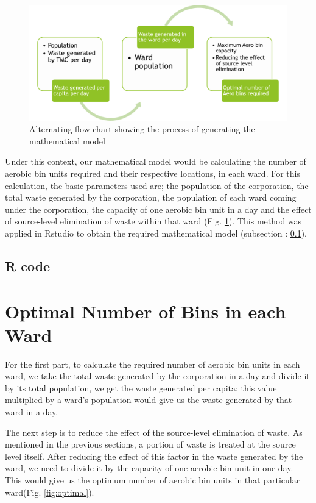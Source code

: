 \documentclass[12pt,a4paper]{report}
\begin{document}
\begin{figure}[H]
	\centering
	\includegraphics[width=0.8\linewidth]{mathmod}
	\caption{Alternating flow chart showing the process of generating the mathematical model}
	\label{fig:mathmod}
\end{figure}

Under this context, our mathematical model would be calculating the number of aerobic bin units required and their respective locations, in each ward. For this calculation, the basic parameters used are; the population of the corporation, the total waste generated by the corporation, the population of each ward coming under the corporation, the capacity of one aerobic bin unit in a day and the effect of source-level elimination of waste within that ward (Fig. \ref{fig:mathmod}). This method was applied in Rstudio to obtain the required mathematical model (subsection : \ref{Rcode}). 


\newpage
\subsection{R code}
\label{Rcode}
\lstset{style=mystyle}


\newpage
\section{Optimal Number of Bins in each Ward}
For the first part, to calculate the required number of aerobic bin units in each ward, we take the total waste generated by the corporation in a day and divide it by its total population, we get the waste generated per capita; this value multiplied by a ward’s population would give us the waste generated by that ward in a day. 

The next step is to reduce the effect of the source-level elimination of waste. As mentioned in the previous sections, a portion of waste is treated at the source level itself. After reducing the effect of this factor in the waste generated by the ward, we need to divide it by the capacity of one aerobic bin unit in one day. This would give us the optimum number of aerobic bin units in that particular ward(Fig. \ref{fig:optimal}). 
\end{document}
